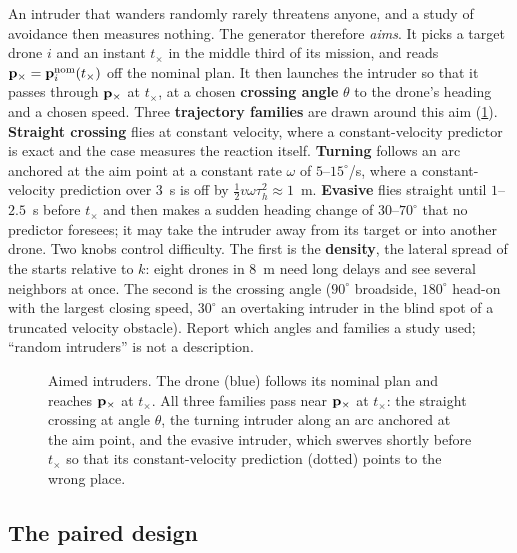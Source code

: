 An intruder that wanders randomly rarely threatens anyone, and a study of
avoidance then measures nothing. The generator therefore \emph{aims}. It
picks a target drone $i$ and an instant $t_\times$ in the middle third of
its mission, and reads $\mathbf{p}_\times = \mathbf{p}_i^{\mathrm{nom}}(t_\times)$ off
the nominal plan. It then launches the intruder so that it passes through
$\mathbf{p}_\times$ at $t_\times$, at a chosen \textbf{crossing
angle} $\theta$ to the drone's heading and a chosen
speed. Three \textbf{trajectory families}
are drawn around this aim (\cref{fig:ch25-intruders}). \textbf{Straight
crossing} flies at constant velocity, where a constant-velocity predictor is
exact and the case measures the reaction itself. \textbf{Turning} follows an
arc anchored at the aim point at a constant rate $\omega$ of
$5$--$15^\circ$/s, where a constant-velocity prediction over $3$~s is off by
$\tfrac12 v\omega\tau_h^2 \approx 1$~m. \textbf{Evasive} flies straight
until $1$--$2.5$~s before $t_\times$ and then makes a sudden heading change
of $30$--$70^\circ$ that no predictor foresees; it may take the intruder
away from its target or into another drone. Two knobs control difficulty.
The first is the \textbf{density}, the lateral spread of the starts relative
to $k$: eight drones in $8$~m need long delays and see several neighbors at
once. The second is the crossing angle ($90^\circ$ broadside, $180^\circ$
head-on with the largest closing speed, $30^\circ$ an overtaking intruder in
the blind spot of a truncated velocity obstacle). Report which angles and
families a study used; ``random intruders'' is not a description.

\begin{figure}[tb]
  \centering
  \caption{Aimed intruders. The drone (blue) follows its nominal plan and
  reaches $\mathbf{p}_\times$ at $t_\times$. All three families pass near
  $\mathbf{p}_\times$ at $t_\times$: the straight crossing at angle $\theta$, the
  turning intruder along an arc anchored at the aim point, and the evasive
  intruder, which swerves shortly before $t_\times$ so that its
  constant-velocity prediction (dotted) points to the wrong place.}
  \label{fig:ch25-intruders}
\end{figure}

\subsection{The paired design}

